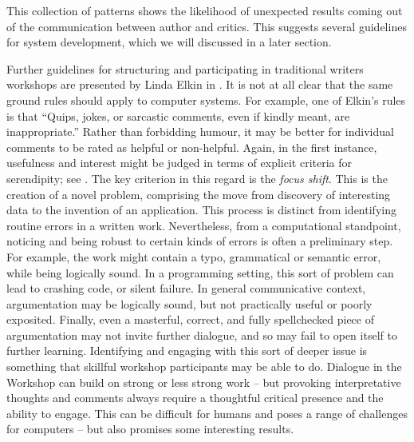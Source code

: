 This collection of patterns shows the likelihood of unexpected results 
coming out of the communication between author and critics.   This
suggests several guidelines for system development, which we will discussed
in a later section.

Further guidelines for structuring and participating in traditional
writers workshops are presented by Linda Elkin in
\cite[pp. 201--203]{gabriel2002writer}.  It is not at all clear that
the same ground rules should apply to computer systems.  For example,
one of Elkin's rules is that ``Quips, jokes, or sarcastic comments,
even if kindly meant, are inappropriate.''  Rather than forbidding
humour, it may be better for individual comments to be rated as
helpful or non-helpful.  Again, in the first instance, usefulness
and interest might be judged in terms of explicit criteria for serendipity;
see \cite{corneli15cc,pease2013discussion}.
The key criterion in this regard is the \emph{focus shift}. 
This is the creation of a novel problem, comprising the move
from discovery of interesting data to the invention of an application.
This process is distinct from identifying routine errors in a written work.  Nevertheless, from a
computational standpoint, noticing and being robust to certain kinds
of errors is often a preliminary step.  For example, the work might
contain a typo, grammatical or semantic error, while being logically
sound.  In a programming setting, this sort of problem can lead to
crashing code, or silent failure.  In general communicative context,
argumentation may be logically sound, but not practically useful or
poorly exposited.  Finally, even a masterful, correct, and fully
spellchecked piece of argumentation may not invite further dialogue,
and so may fail to open itself to further learning.  Identifying and
engaging with this sort of deeper issue is something that skillful
workshop participants may be able to do.  Dialogue in the Workshop
can build on strong or less strong work -- but provoking interpretative
thoughts and comments always require a thoughtful critical presence and
the ability to engage.  This can be difficult for humans and poses a range
of challenges for computers -- but also promises some interesting
results.

\bigskip




